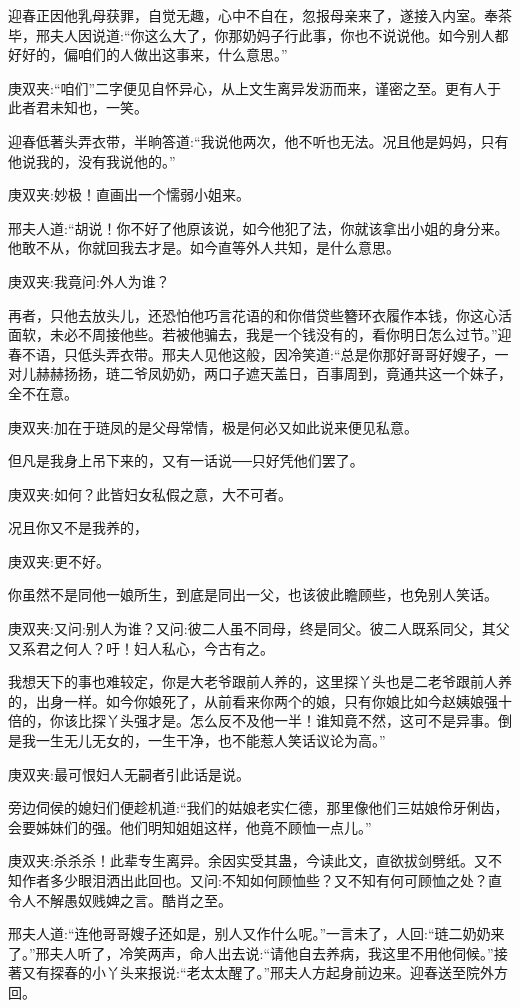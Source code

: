 \begin{parag}
    迎春正因他乳母获罪，自觉无趣，心中不自在，忽报母亲来了，遂接入内室。奉茶毕，邢夫人因说道:“你这么大了，你那奶妈子行此事，你也不说说他。如今别人都好好的，偏咱们的人做出这事来，什么意思。”\begin{note}庚双夹:“咱们”二字便见自怀异心，从上文生离异发沥而来，谨密之至。更有人于此者君未知也，一笑。\end{note}迎春低著头弄衣带，半晌答道:“我说他两次，他不听也无法。况且他是妈妈，只有他说我的，没有我说他的。”\begin{note}庚双夹:妙极！直画出一个懦弱小姐来。\end{note}邢夫人道:“胡说！你不好了他原该说，如今他犯了法，你就该拿出小姐的身分来。他敢不从，你就回我去才是。如今直等外人共知，是什么意思。\begin{note}庚双夹:我竟问:外人为谁？\end{note}再者，只他去放头儿，还恐怕他巧言花语的和你借贷些簪环衣履作本钱，你这心活面软，未必不周接他些。若被他骗去，我是一个钱没有的，看你明日怎么过节。”迎春不语，只低头弄衣带。邢夫人见他这般，因冷笑道:“总是你那好哥哥好嫂子，一对儿赫赫扬扬，琏二爷凤奶奶，两口子遮天盖日，百事周到，竟通共这一个妹子，全不在意。\begin{note}庚双夹:加在于琏凤的是父母常情，极是何必又如此说来便见私意。\end{note}但凡是我身上吊下来的，又有一话说──只好凭他们罢了。\begin{note}庚双夹:如何？此皆妇女私假之意，大不可者。\end{note}况且你又不是我养的，\begin{note}庚双夹:更不好。\end{note}你虽然不是同他一娘所生，到底是同出一父，也该彼此瞻顾些，也免别人笑话。\begin{note}庚双夹:又问:别人为谁？又问:彼二人虽不同母，终是同父。彼二人既系同父，其父又系君之何人？吁！妇人私心，今古有之。\end{note}我想天下的事也难较定，你是大老爷跟前人养的，这里探丫头也是二老爷跟前人养的，出身一样。如今你娘死了，从前看来你两个的娘，只有你娘比如今赵姨娘强十倍的，你该比探丫头强才是。怎么反不及他一半！谁知竟不然，这可不是异事。倒是我一生无儿无女的，一生干净，也不能惹人笑话议论为高。”\begin{note}庚双夹:最可恨妇人无嗣者引此话是说。\end{note}旁边伺侯的媳妇们便趁机道:“我们的姑娘老实仁德，那里像他们三姑娘伶牙俐齿，会要姊妹们的强。他们明知姐姐这样，他竟不顾恤一点儿。”\begin{note}庚双夹:杀杀杀！此辈专生离异。余因实受其蛊，今读此文，直欲拔剑劈纸。又不知作者多少眼泪洒出此回也。又问:不知如何顾恤些？又不知有何可顾恤之处？直令人不解愚奴贱婢之言。酷肖之至。\end{note}邢夫人道:“连他哥哥嫂子还如是，别人又作什么呢。”一言未了，人回:“琏二奶奶来了。”邢夫人听了，冷笑两声，命人出去说:“请他自去养病，我这里不用他伺候。”接著又有探春的小丫头来报说:“老太太醒了。”邢夫人方起身前边来。迎春送至院外方回。
\end{parag}


